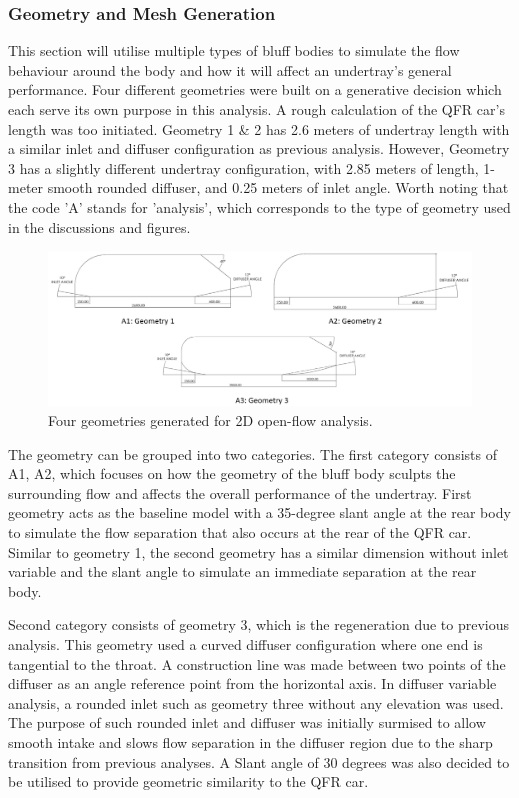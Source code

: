 \subsubsection{Geometry and Mesh Generation}
This section will utilise multiple types of bluff bodies to simulate the flow behaviour around the body and how it will affect an undertray's general performance. Four different geometries were built on a generative decision which each serve its own purpose in this analysis. A rough calculation of the QFR car's length was too initiated. Geometry 1 \& 2 has 2.6 meters of undertray length with a similar inlet and diffuser configuration as previous analysis. However, Geometry 3 has a slightly different undertray configuration, with 2.85 meters of length, 1-meter smooth rounded diffuser, and 0.25 meters of inlet angle. Worth noting that the code 'A' stands for 'analysis', which corresponds to the type of geometry used in the discussions and figures.

\begin{figure}[!ht]
    \centering
    \includegraphics[scale = 0.5]{Figures/2D_OF/2D_OF_GEOM.png}
    \caption{Four geometries generated for 2D open-flow analysis.}
    \label{fig:2D_OF_GEOM}
\end{figure}

\noindent The geometry can be grouped into two categories. The first category consists of A1, A2, which focuses on how the geometry of the bluff body sculpts the surrounding flow and affects the overall performance of the undertray. First geometry acts as the baseline model with a 35-degree slant angle at the rear body to simulate the flow separation that also occurs at the rear of the QFR car. Similar to geometry 1, the second geometry has a similar dimension without inlet variable and the slant angle to simulate an immediate separation at the rear body.

\noindent Second category consists of geometry 3, which is the regeneration due to previous analysis. This geometry used a curved diffuser configuration where one end is tangential to the throat. A construction line was made between two points of the diffuser as an angle reference point from the horizontal axis. In diffuser variable analysis, a rounded inlet such as geometry three without any elevation was used. The purpose of such rounded inlet and diffuser was initially surmised to allow smooth intake and slows flow separation in the diffuser region due to the sharp transition from previous analyses. A Slant angle of 30 degrees was also decided to be utilised to provide geometric similarity to the QFR car.

